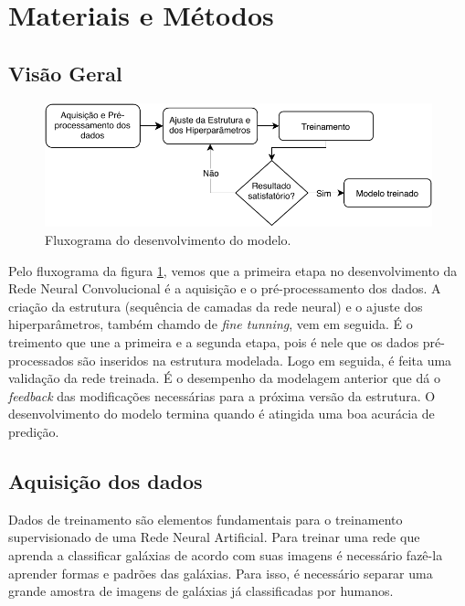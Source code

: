 \section*{Materiais e Métodos}

\subsection*{Visão Geral}

\begin{figure}[h!]
  \centering
  \includegraphics[width=\textwidth]{figures/dl_diagram.pdf}
  \caption{Fluxograma do desenvolvimento do modelo.}
  \label{fig:fluxogram}
\end{figure}

Pelo fluxograma da figura \ref{fig:fluxogram}, vemos que a primeira etapa no desenvolvimento da Rede Neural Convolucional é a aquisição e o pré-processamento dos dados. A criação da estrutura (sequência de camadas da rede neural) e o ajuste dos hiperparâmetros, também chamdo de \emph{fine tunning}, vem em seguida. É o treimento que une a primeira e a segunda etapa, pois é nele que os dados pré-processados são inseridos na estrutura modelada. Logo em seguida, é feita uma validação da rede treinada. É o desempenho da modelagem anterior que dá o \emph{feedback} das modificações necessárias para a próxima versão da estrutura. O desenvolvimento do modelo termina quando é atingida uma boa acurácia de predição.

\subsection*{Aquisição dos dados}

Dados de treinamento são elementos fundamentais para o treinamento supervisionado de uma Rede Neural Artificial. Para treinar uma rede que aprenda a classificar galáxias de acordo com suas imagens é necessário fazê-la aprender formas e padrões das galáxias. Para isso, é necessário separar uma grande amostra de imagens de galáxias já classificadas por humanos.

